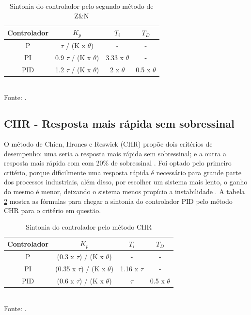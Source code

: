 \documentclass[12 pt,conference]{IEEEtran}
\begin{document}
\begin{table}[!h]
        \centering
        \caption{Sintonia do controlador pelo segundo método de Z\&N}
        \begin{tabular}{|c|c|c|c|} \hline
       Controlador  & \(K_p\) & \(T_i\) & \(T_D\)  \\ \hline 
         P & \(\tau\) / (K x \(\theta\)) & - &  -\\ \hline 
         PI & 0.9  \(\tau\) / (K x \(\theta\)) & 3.33 x \(\theta\)  & - \\ \hline 
         PID & 1.2  \(\tau\) / (K x \(\theta\)) & 2 x \(\theta\) & 0.5 x \(\theta\) \\ \hline
        \end{tabular}\\
        \label{calczn}
        Fonte: \cite{teixeira2010controles}.
        \label{sintonia}
    \end{table}
    
    \subsection{CHR - Resposta mais rápida sem sobressinal}
    
    O método de Chien, Hrones e Reswick (CHR) propõe dois critérios de desempenho: uma seria a resposta mais rápida sem sobressinal; e a outra a resposta mais rápida com com 20\% de sobressinal \cite{teixeira2010controles}. Foi optado pelo primeiro critério, porque dificilmente uma resposta rápida é necessário para grande parte dos processos industriais, além disso, por escolher um sistema mais lento, o ganho do mesmo é menor, deixando o sistema menos propício a instabilidade \cite{teixeira2010controles}. A tabela \ref{sintoniaCHR} mostra as fórmulas para chegar a sintonia do controlador PID pelo método CHR para o critério em questão.
    
    \begin{table}[!h]
        \centering
        \caption{Sintonia do controlador pelo método CHR}
        \begin{tabular}{|c|c|c|c|} \hline
       Controlador  & \(K_p\) & \(T_i\) & \(T_D\)  \\ \hline 
         P & (0.3 x \(\tau\)) / (K x \(\theta\)) & - &  -\\ \hline 
         PI & (0.35 x \(\tau\)) / (K x \(\theta\)) & 1.16 x \(\tau\)  & - \\ \hline 
         PID & (0.6 x \(\tau\)) / (K x \(\theta\)) & \(\tau\) & 0.5 x \(\theta\) \\ \hline
        \end{tabular}\\
        \label{calcchr}
        Fonte: \cite{teixeira2010controles}.
        \label{sintoniaCHR}
    \end{table}
    
\end{document}
